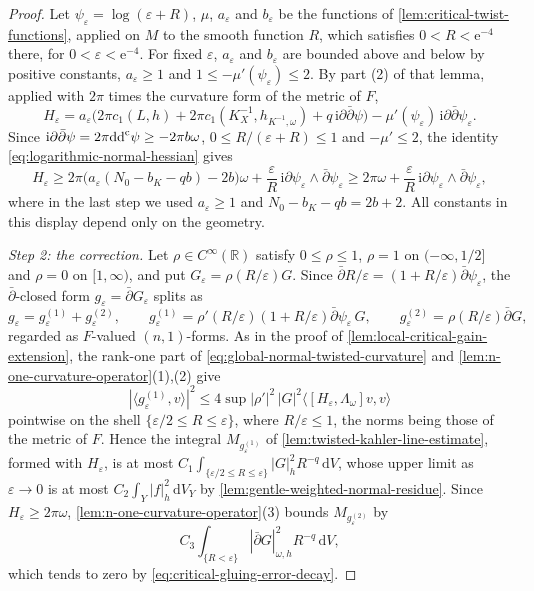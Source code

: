 \begin{proof}
Let $\psi_\varepsilon=\log(\varepsilon+R)$, $\mu$, $a_\varepsilon$ and $b_\varepsilon$ be the functions of \cref{lem:critical-twist-functions}, applied on $M$ to the smooth function $R$, which satisfies $0<R<\mathrm e^{-4}$ there, for $0<\varepsilon<\mathrm e^{-4}$. For fixed $\varepsilon$, $a_\varepsilon$ and $b_\varepsilon$ are bounded above and below by positive constants, $a_\varepsilon\geq1$ and $1\leq-\mu'(\psi_\varepsilon)\leq2$. By part (2) of that lemma, applied with $2\pi$ times the curvature form of the metric of $F$,
\[
 H_\varepsilon=a_\varepsilon\bigl(2\pi c_1(L,h)
              +2\pi c_1(K_X^{-1},h_{K^{-1},\omega})
              +q\,\mathrm i\partial\bar\partial\psi\bigr)
        -\mu'(\psi_\varepsilon)\,
                         \mathrm i\partial\bar\partial\psi_\varepsilon.
\]
Since $\mathrm i\partial\bar\partial\psi=2\pi\mathrm{dd}^{\mathrm{c}}\psi\geq-2\pi b\omega$, $0\leq R/(\varepsilon+R)\leq1$ and $-\mu'\leq2$, the identity \eqref{eq:logarithmic-normal-hessian} gives
\begin{equation}\label{eq:global-normal-twisted-curvature}
 H_\varepsilon\geq
  2\pi\bigl(a_\varepsilon(N_0-b_K-qb)-2b\bigr)\omega
       +\frac{\varepsilon}{R}\,
                  \mathrm i\partial\psi_\varepsilon\wedge\bar\partial\psi_\varepsilon
 \geq 2\pi\omega+\frac{\varepsilon}{R}\,
                  \mathrm i\partial\psi_\varepsilon\wedge\bar\partial\psi_\varepsilon,
\end{equation}
where in the last step we used $a_\varepsilon\geq1$ and $N_0-b_K-qb=2b+2$. All constants in this display depend only on the geometry.

\emph{Step 2: the correction.} Let $\rho\in C^\infty(\mathbb R)$ satisfy $0\leq\rho\leq1$, $\rho=1$ on $(-\infty,1/2]$ and $\rho=0$ on $[1,\infty)$, and put $G_\varepsilon=\rho(R/\varepsilon)G$. Since $\bar\partial R/\varepsilon=(1+R/\varepsilon)\bar\partial\psi_\varepsilon$, the $\bar\partial$-closed form $g_\varepsilon=\bar\partial G_\varepsilon$ splits as
\[
 g_\varepsilon=g_\varepsilon^{(1)}+g_\varepsilon^{(2)},\qquad
 g_\varepsilon^{(1)}=\rho'(R/\varepsilon)(1+R/\varepsilon)
                         \bar\partial\psi_\varepsilon\,G,
 \qquad g_\varepsilon^{(2)}=\rho(R/\varepsilon)\bar\partial G,
\]
regarded as $F$-valued $(n,1)$-forms. As in the proof of \cref{lem:local-critical-gain-extension}, the rank-one part of \eqref{eq:global-normal-twisted-curvature} and \cref{lem:n-one-curvature-operator}(1),(2) give
\[
 |\langle g_\varepsilon^{(1)},v\rangle|^2\leq4\sup|\rho'|^2\,|G|^2\langle[H_\varepsilon,\Lambda_\omega]v,v\rangle
\]
pointwise on the shell $\{\varepsilon/2\leq R\leq\varepsilon\}$, where $R/\varepsilon\leq1$, the norms being those of the metric of $F$. Hence the integral $M_{g_\varepsilon^{(1)}}$ of \cref{lem:twisted-kahler-line-estimate}, formed with $H_\varepsilon$, is at most $C_1\int_{\{\varepsilon/2\leq R\leq\varepsilon\}}|G|_h^2R^{-q}\,\mathrm dV$, whose upper limit as $\varepsilon\to0$ is at most $C_2\int_Y|f|_h^2\,\mathrm dV_Y$ by \cref{lem:gentle-weighted-normal-residue}. Since $H_\varepsilon\geq2\pi\omega$, \cref{lem:n-one-curvature-operator}(3) bounds $M_{g_\varepsilon^{(2)}}$ by
\[
 C_3\int_{\{R<\varepsilon\}}|\bar\partial G|_{\omega,h}^2R^{-q}\,\mathrm dV,
\]
which tends to zero by \eqref{eq:critical-gluing-error-decay}.


\end{proof}
